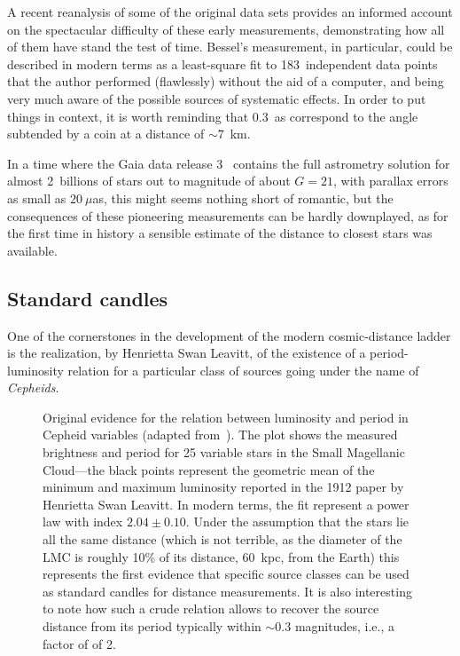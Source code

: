 A recent reanalysis \cite{2020AN....341..860R} of some of the original data sets
provides an informed account on the spectacular difficulty of these early measurements,
demonstrating how all of them have stand the test of time. Bessel's measurement,
in particular, could be described in modern terms as a least-square fit to 183~independent
data points that the author performed (flawlessly) without the aid of a computer,
and being very much aware of the possible sources of systematic effects. In order
to put things in context, it is worth reminding that 0.3~as correspond to the angle
subtended by a coin at a distance of $\sim 7$~km.

In a time where the Gaia data release 3~\cite{2023A&A...674A...1G} contains the
full astrometry solution for almost 2~billions of stars out to magnitude of about
$G = 21$, with parallax errors as small as $20~\mu$as, this might seems nothing
short of romantic, but the consequences of these pioneering measurements can be
hardly downplayed, as for the first time in history a sensible estimate of the distance
to closest stars was available.



\subsection{Standard candles}
\label{dec:standard_candles}

One of the cornerstones in the development of the modern cosmic-distance ladder is
the realization, by Henrietta Swan Leavitt, of the existence of
a period-luminosity relation for a particular class of sources going under the name
of \emph{Cepheids}.

\begin{figure}[htbp!]
	
	\caption{Original evidence for the relation between luminosity and period in
    Cepheid variables (adapted from~\cite{1912HarCi.173....1L}). The plot
    shows the measured brightness and period for 25 variable stars in the Small
    Magellanic Cloud---the black points represent the geometric mean of the
    minimum and maximum luminosity reported in the 1912 paper by Henrietta Swan Leavitt.
    In modern terms, the fit represent a power law with index $2.04 \pm 0.10$.
    Under the assumption that the stars lie all the same distance (which is not
    terrible, as the diameter of the LMC is roughly 10\% of its distance, 60~kpc,
    from the Earth) this represents the first evidence that specific source classes
    can be used as standard candles for distance measurements. It is also interesting
    to note how such a crude relation allows to recover the source distance
    from its period typically within $\sim 0.3$ magnitudes, i.e., a factor of of 2.}
\end{figure}

